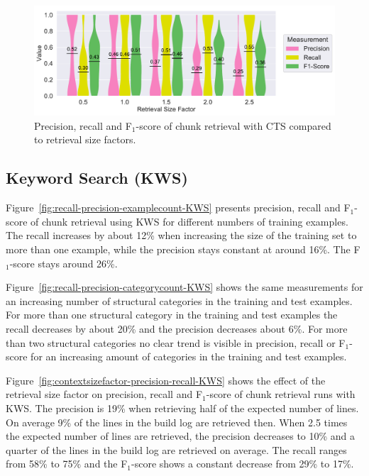 \documentclass[\myrootdir/main.tex]{subfiles}
\begin{document}
\begin{figure}[hp]
		\centering
		\includegraphics[width=\textwidth, clip]{img/big-study/contextsizefactor-precision-recall-CTS.pdf}
		\caption{Precision, recall and F$_{1}$-score of chunk retrieval with CTS compared to retrieval size factors.}
		\label{fig:contextsizefactor-precision-recall-CTS}
\end{figure}


\subsection{Keyword Search (KWS)}
Figure~\ref{fig:recall-precision-examplecount-KWS} presents precision, recall and F$_{1}$-score of chunk retrieval using KWS for different numbers of training examples.
The recall increases by about 12\% when increasing the size of the training set to more than one example, while the precision stays constant at around 16\%.
The F$_{1}$-score stays around 26\%.

Figure~\ref{fig:recall-precision-categorycount-KWS} shows the same measurements for an increasing number of structural categories in the training and test examples.
For more than one structural category in the training and test examples the recall decreases by about 20\% and the precision decreases about 6\%.
For more than two structural categories no clear trend is visible in precision, recall or F$_{1}$-score for an increasing amount of categories in the training and test examples.

Figure~\ref{fig:contextsizefactor-precision-recall-KWS} shows the effect of the retrieval size factor on precision, recall and F$_{1}$-score of chunk retrieval runs with KWS\@.
The precision is 19\% when retrieving half of the expected number of lines. On average 9\% of the lines in the build log are retrieved then.
When 2.5 times the expected number of lines are retrieved, the precision decreases to 10\% and a quarter of the lines in the build log are retrieved on average.
The recall ranges from 58\% to 75\% and the F$_{1}$-score shows a constant decrease from 29\% to 17\%.
\end{document}
